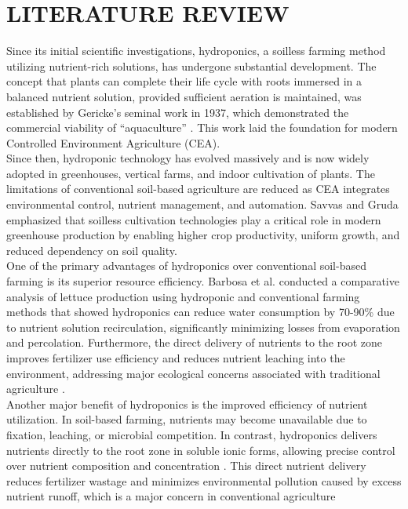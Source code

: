 \chapter{LITERATURE REVIEW}
Since its initial scientific investigations, hydroponics, a soilless farming method utilizing
nutrient-rich solutions, has undergone substantial development. The concept that plants
can complete their life cycle with roots immersed in a balanced nutrient solution,
provided sufficient aeration is maintained, was established by Gericke’s seminal work
in 1937, which demonstrated the commercial viability of “aquaculture” \cite{gericke1937}.
This work laid the foundation for modern Controlled Environment Agriculture (CEA).\\[10pt]
Since then, hydroponic technology has evolved massively and is now widely adopted in
greenhouses, vertical farms, and indoor cultivation of plants. The limitations of conventional
soil-based agriculture are reduced as CEA integrates environmental control, nutrient
management, and automation. Savvas and Gruda \cite{savvas2018} emphasized that soilless
cultivation technologies play a critical role in modern greenhouse production by enabling
higher crop productivity, uniform growth, and reduced dependency on soil quality.\\[10pt]
One of the primary advantages of hydroponics over conventional soil-based farming is its
superior resource efficiency. Barbosa et al. \cite{barbosa2015} conducted a comparative
analysis of lettuce production using hydroponic and conventional farming methods that
showed hydroponics can reduce water consumption by 70-90\% due to nutrient
solution recirculation, significantly minimizing losses from evaporation and percolation.
Furthermore, the direct delivery of nutrients to the root zone improves fertilizer use
efficiency and reduces nutrient leaching into the environment, addressing major ecological
concerns associated with traditional agriculture \cite{savvas2018}.\\[10pt]
Another major benefit of hydroponics is the improved efficiency of nutrient utilization. In
soil-based farming, nutrients may become unavailable due to fixation, leaching, or microbial
competition. In contrast, hydroponics delivers nutrients directly to the root zone in soluble
ionic forms, allowing precise control over nutrient composition and concentration \cite{trejo2012}.
This direct nutrient delivery reduces fertilizer wastage and minimizes environmental
pollution caused by excess nutrient runoff, which is a major concern in conventional agriculture
